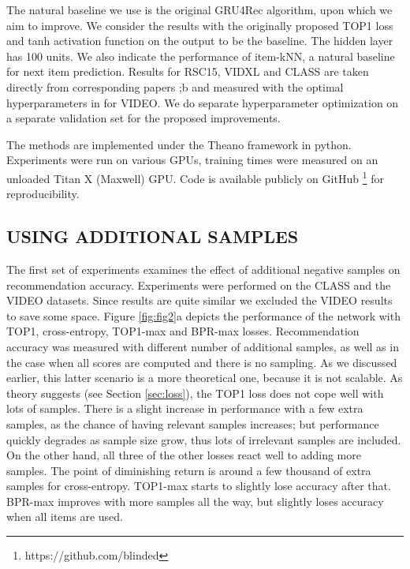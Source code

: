 \documentclass{article} %
\begin{document}
The natural baseline we use is the original GRU4Rec algorithm, upon which we aim to improve. We consider the results with the originally proposed TOP1 loss and tanh activation function on the
output to be the baseline. The hidden layer has 100 units. We also indicate the performance of item-kNN, a natural baseline for next item prediction. Results for RSC15, VIDXL and CLASS are
taken directly from corresponding papers \cite{hidasi2016a};b and measured with the optimal hyperparameters in \cite{hidasi2016a} for VIDEO. We do separate hyperparameter optimization on a separate validation set for the proposed improvements.

The methods are implemented under the Theano framework 
\cite{al2016theano}in python. Experiments were run on various GPUs, training times were measured on an unloaded Titan X (Maxwell) GPU. Code is available publicly on GitHub \footnote[10]{https://github.com/blinded} for reproducibility.

\subsection{USING ADDITIONAL SAMPLES}
The first set of experiments examines the effect of additional negative samples on recommendation
accuracy. Experiments were performed on the CLASS and the VIDEO datasets. Since results are quite similar we excluded the VIDEO results to save some space. Figure \ref{fig:fig2}a depicts the performance of the network with TOP1, cross-entropy, TOP1-max and BPR-max losses. Recommendation accuracy was measured with different number of additional samples, as well as in the case when all scores are computed and there is no sampling. As we discussed earlier, this latter scenario is a more theoretical one, because it is not scalable. As theory suggests (see Section \ref{sec:loss}), the TOP1 loss does not cope well with lots of samples. There is a slight increase in performance with a few extra samples, as the chance of having relevant samples increases; but performance quickly degrades as sample size grow, thus lots of irrelevant samples are included. On the other hand, all three of the other losses react well to adding more samples. The point of diminishing return is around a few thousand of extra samples for cross-entropy. TOP1-max starts to slightly lose accuracy after that. BPR-max improves with more samples all the way, but slightly loses accuracy when all items are used.
\end{document}
